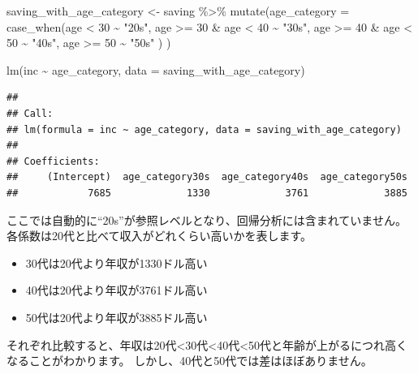 \documentclass[
]{book}
\newenvironment{Shaded}{\begin{snugshade}}{\end{snugshade}}
\newcommand{\AttributeTok}[1]{\textcolor[rgb]{0.77,0.63,0.00}{#1}}
\newcommand{\DecValTok}[1]{\textcolor[rgb]{0.00,0.00,0.81}{#1}}
\newcommand{\FunctionTok}[1]{\textcolor[rgb]{0.00,0.00,0.00}{#1}}
\newcommand{\NormalTok}[1]{#1}
\newcommand{\OtherTok}[1]{\textcolor[rgb]{0.56,0.35,0.01}{#1}}
\newcommand{\SpecialCharTok}[1]{\textcolor[rgb]{0.00,0.00,0.00}{#1}}
\newcommand{\StringTok}[1]{\textcolor[rgb]{0.31,0.60,0.02}{#1}}
\providecommand{\tightlist}{%
  \setlength{\itemsep}{0pt}\setlength{\parskip}{0pt}}
\begin{document}
\begin{Shaded}
\begin{Highlighting}[]
\NormalTok{saving\_with\_age\_category }\OtherTok{\textless{}{-}}
\NormalTok{  saving }\SpecialCharTok{\%\textgreater{}\%}
    \FunctionTok{mutate}\NormalTok{(}\AttributeTok{age\_category =} \FunctionTok{case\_when}\NormalTok{(age }\SpecialCharTok{\textless{}} \DecValTok{30} \SpecialCharTok{\textasciitilde{}} \StringTok{"20s"}\NormalTok{,}
\NormalTok{                                    age }\SpecialCharTok{\textgreater{}=} \DecValTok{30} \SpecialCharTok{\&}\NormalTok{ age }\SpecialCharTok{\textless{}} \DecValTok{40} \SpecialCharTok{\textasciitilde{}} \StringTok{"30s"}\NormalTok{,}
\NormalTok{                                    age }\SpecialCharTok{\textgreater{}=} \DecValTok{40} \SpecialCharTok{\&}\NormalTok{ age }\SpecialCharTok{\textless{}} \DecValTok{50} \SpecialCharTok{\textasciitilde{}} \StringTok{"40s"}\NormalTok{,}
\NormalTok{                                    age }\SpecialCharTok{\textgreater{}=} \DecValTok{50} \SpecialCharTok{\textasciitilde{}} \StringTok{"50s"}
\NormalTok{                                    )}
\NormalTok{          )}

\FunctionTok{lm}\NormalTok{(inc }\SpecialCharTok{\textasciitilde{}}\NormalTok{ age\_category, }\AttributeTok{data =}\NormalTok{ saving\_with\_age\_category)}
\end{Highlighting}
\end{Shaded}

\begin{verbatim}
## 
## Call:
## lm(formula = inc ~ age_category, data = saving_with_age_category)
## 
## Coefficients:
##     (Intercept)  age_category30s  age_category40s  age_category50s  
##            7685             1330             3761             3885
\end{verbatim}

ここでは自動的に``20s''が参照レベルとなり、回帰分析には含まれていません。
各係数は20代と比べて収入がどれくらい高いかを表します。

\begin{itemize}
\tightlist
\item
  30代は20代より年収が1330ドル高い
\item
  40代は20代より年収が3761ドル高い
\item
  50代は20代より年収が3885ドル高い
\end{itemize}

それぞれ比較すると、年収は20代\textless30代\textless40代\textless50代と年齢が上がるにつれ高くなることがわかります。
しかし、40代と50代では差はほぼありません。
\end{document}
